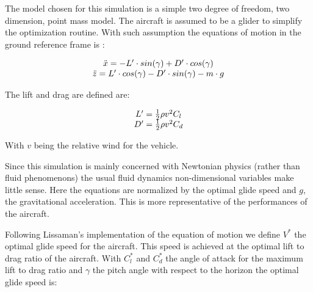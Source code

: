 

\par The model chosen for this simulation is a simple two degree of freedom, two dimension, point mass model. 
The aircraft is assumed to be a glider to simplify the optimization routine. 
With such assumption the equations of motion in the ground reference frame is :

\begin{equation}
	\begin{array}[c]{c}
		\ddot{x}= -L' \cdot sin(\gamma) + D' \cdot cos(\gamma) \\ 
		\ddot{z}= L' \cdot cos(\gamma) - D' \cdot sin(\gamma) - m \cdot g
	\end{array}
	\label{eqn:eqm}
\end{equation}


\par The lift and drag are defined are: 

\begin{equation}
	\begin{array}[c]{c}
		L'= \frac{1}{2} \rho v^2 C_l \\ 
		D'= \frac{1}{2} \rho v^2 C_d 
	\end{array}
	\label{eqn:Cl_def}
\end{equation}

\par With $v$ being the relative wind for the vehicle.

\par Since this simulation is mainly concerned with Newtonian physics (rather than fluid phenomenons) the usual fluid dynamics non-dimensional variables make little sense.
Here the equations are normalized by the optimal glide speed and $g$, the gravitational acceleration.
This is more representative of the performances of the aircraft.

\par Following Lissaman's \cite{lissaman2005wind} implementation of the equation of motion we define $V^*$ the optimal glide speed for the aircraft. 
This speed is achieved at the optimal lift to drag ratio of the aircraft.
With $C_l^*$ and $C_d^*$ the angle of attack for the maximum lift to drag ratio and $\gamma$ the pitch angle with respect to the horizon the optimal glide speed is:

